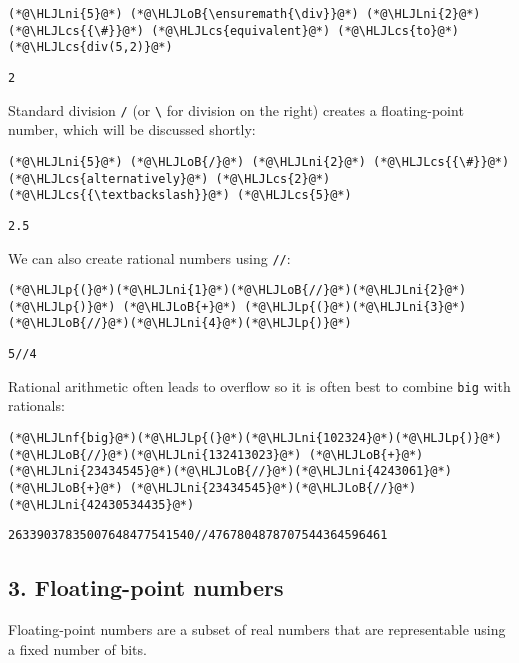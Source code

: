 \documentclass[12pt,a4paper]{article}
\newcommand{\HLJLnf}[1]{\textcolor[RGB]{66,102,213}{#1}}
\newcommand{\HLJLni}[1]{\textcolor[RGB]{59,151,46}{#1}}
\newcommand{\HLJLoB}[1]{\textcolor[RGB]{102,102,102}{\textbf{#1}}}
\newcommand{\HLJLp}[1]{#1}
\newcommand{\HLJLcs}[1]{\textcolor[RGB]{153,153,119}{\textit{#1}}}
\begin{document}
\begin{lstlisting}
(*@\HLJLni{5}@*) (*@\HLJLoB{\ensuremath{\div}}@*) (*@\HLJLni{2}@*) (*@\HLJLcs{{\#}}@*) (*@\HLJLcs{equivalent}@*) (*@\HLJLcs{to}@*) (*@\HLJLcs{div(5,2)}@*)
\end{lstlisting}

\begin{lstlisting}
2
\end{lstlisting}


Standard division \texttt{/} (or \texttt{{\textbackslash}} for division on the right) creates a floating-point number, which will be discussed shortly:


\begin{lstlisting}
(*@\HLJLni{5}@*) (*@\HLJLoB{/}@*) (*@\HLJLni{2}@*) (*@\HLJLcs{{\#}}@*) (*@\HLJLcs{alternatively}@*) (*@\HLJLcs{2}@*) (*@\HLJLcs{{\textbackslash}}@*) (*@\HLJLcs{5}@*)
\end{lstlisting}

\begin{lstlisting}
2.5
\end{lstlisting}


We can also create rational numbers using \texttt{//}:


\begin{lstlisting}
(*@\HLJLp{(}@*)(*@\HLJLni{1}@*)(*@\HLJLoB{//}@*)(*@\HLJLni{2}@*)(*@\HLJLp{)}@*) (*@\HLJLoB{+}@*) (*@\HLJLp{(}@*)(*@\HLJLni{3}@*)(*@\HLJLoB{//}@*)(*@\HLJLni{4}@*)(*@\HLJLp{)}@*)
\end{lstlisting}

\begin{lstlisting}
5//4
\end{lstlisting}


Rational arithmetic often leads to overflow so it is often best to combine \texttt{big} with rationals:


\begin{lstlisting}
(*@\HLJLnf{big}@*)(*@\HLJLp{(}@*)(*@\HLJLni{102324}@*)(*@\HLJLp{)}@*)(*@\HLJLoB{//}@*)(*@\HLJLni{132413023}@*) (*@\HLJLoB{+}@*) (*@\HLJLni{23434545}@*)(*@\HLJLoB{//}@*)(*@\HLJLni{4243061}@*) (*@\HLJLoB{+}@*) (*@\HLJLni{23434545}@*)(*@\HLJLoB{//}@*)(*@\HLJLni{42430534435}@*)
\end{lstlisting}

\begin{lstlisting}
26339037835007648477541540//4767804878707544364596461
\end{lstlisting}


\subsection{3. Floating-point numbers}
Floating-point numbers are a subset of real numbers that are representable using a fixed number of bits.
\end{document}
